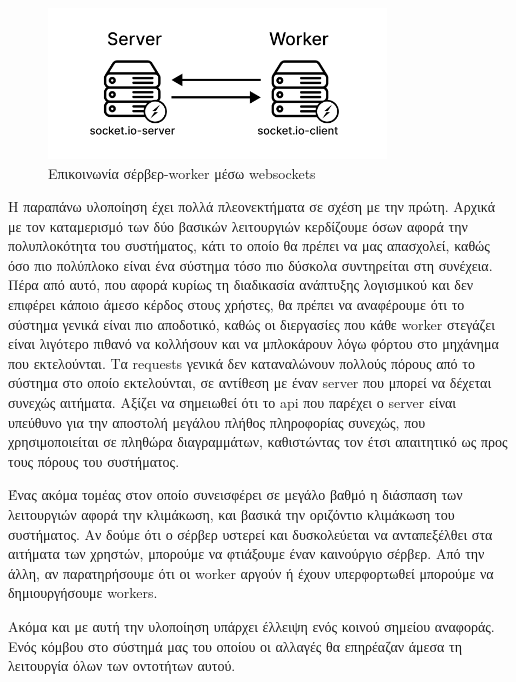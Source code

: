 \begin{figure}[!ht]
	\centering
	\includegraphics[width=0.8\textwidth]{./images/chapter4/socket.io-communication.png}
	\caption[Επικοινωνία σέρβερ-worker μέσω websockets]{Επικοινωνία σέρβερ-worker μέσω websockets}
	\label{fig:socketio-communitation}
\end{figure}

Η παραπάνω υλοποίηση έχει πολλά πλεονεκτήματα σε σχέση με την πρώτη. Αρχικά με τον καταμερισμό
των δύο βασικών λειτουργιών κερδίζουμε όσων αφορά την πολυπλοκότητα του συστήματος, κάτι το οποίο θα πρέπει να μας απασχολεί,
καθώς όσο πιο πολύπλοκο είναι ένα σύστημα τόσο πιο δύσκολα συντηρείται στη συνέχεια. Πέρα από αυτό, που αφορά
κυρίως τη διαδικασία ανάπτυξης λογισμικού και δεν επιφέρει κάποιο άμεσο κέρδος στους χρήστες, θα πρέπει να αναφέρουμε
ότι το σύστημα γενικά είναι πιο αποδοτικό, καθώς οι διεργασίες που κάθε worker στεγάζει είναι λιγότερο πιθανό να
κολλήσουν και να μπλοκάρουν λόγω φόρτου στο μηχάνημα που εκτελούνται. Τα requests γενικά δεν καταναλώνουν πολλούς πόρους από το σύστημα στο οποίο εκτελούνται,
σε αντίθεση με έναν server που μπορεί να δέχεται συνεχώς αιτήματα. Αξίζει να σημειωθεί ότι το api που παρέχει ο server είναι υπεύθυνο
για την αποστολή μεγάλου πλήθος πληροφορίας συνεχώς, που χρησιμοποιείται σε πληθώρα διαγραμμάτων, καθιστώντας τον έτσι απαιτητικό ως προς τους πόρους του
συστήματος. 

Ένας ακόμα τομέας στον οποίο συνεισφέρει σε μεγάλο βαθμό η διάσπαση των λειτουργιών αφορά την κλιμάκωση, και βασικά την οριζόντιο κλιμάκωση
του συστήματος. Αν δούμε ότι ο σέρβερ υστερεί και δυσκολεύεται να ανταπεξέλθει στα αιτήματα των χρηστών,
μπορούμε να φτιάξουμε έναν καινούργιο σέρβερ. Από την άλλη, αν παρατηρήσουμε ότι οι worker αργούν ή έχουν υπερφορτωθεί
μπορούμε να δημιουργήσουμε workers.

Ακόμα και με αυτή την υλοποίηση υπάρχει έλλειψη ενός κοινού σημείου αναφοράς. Ενός κόμβου στο σύστημά μας του οποίου
οι αλλαγές θα επηρέαζαν άμεσα τη λειτουργία όλων των οντοτήτων αυτού.  